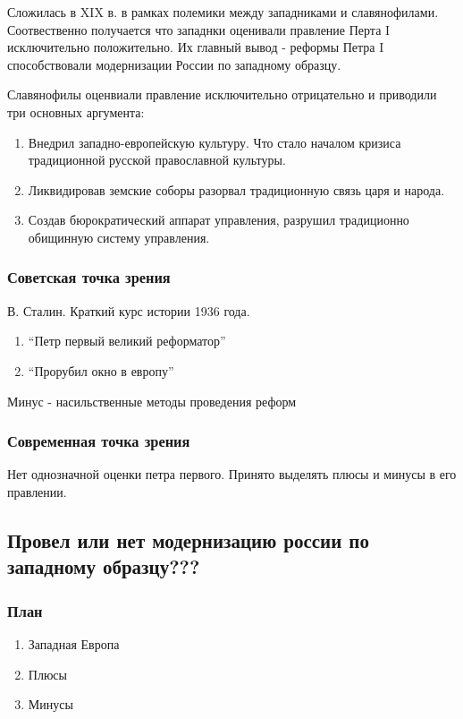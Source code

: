 \documentclass[a4paper]{article}
\begin{document}
Сложилась в XIX в. в рамках полемики между западниками и славянофилами. Соотвественно получается что западнки оценивали правление Перта I исключительно положительно. Их главный вывод - реформы Петра I способствовали модернизации России по западному образцу.

Славянофилы оценвиали правление исключительно отрицательно и приводили три основных аргумента:
\begin{enumerate}
    \item Внедрил западно-европейскую культуру. Что стало началом кризиса традиционной русской православной культуры.
    \item Ликвидировав земские соборы разорвал традиционную связь царя и народа.
    \item Создав бюрократический аппарат управления, разрушил традиционно обищинную систему управления.
\end{enumerate}

\subsubsection{Советская точка зрения}
В. Сталин.
Краткий курс истории 1936 года.
\begin{enumerate}
    \item ``Петр первый великий реформатор''
    \item ``Прорубил окно в европу''
\end{enumerate}
Минус - насильственные методы проведения реформ

\subsubsection{Современная точка зрения}
Нет однозначной оценки петра первого. Принято выделять плюсы и минусы в его правлении.

\subsection{Провел или нет модернизацию россии по западному образцу???}
\subsubsection{План}
\begin{enumerate}
    \item Западная Европа
    \item Плюсы
    \item Минусы
\end{enumerate}
\end{document}
